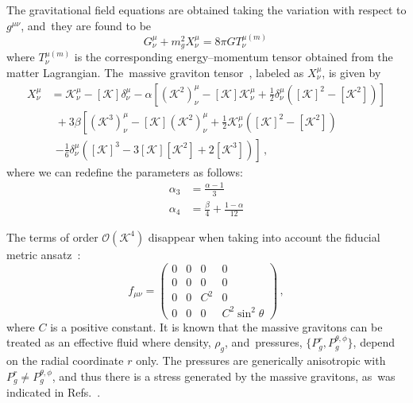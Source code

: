\documentclass[aps,amsmath,amssymb,twocolumn]{revtex4}
\begin{document}
The gravitational field equations are obtained taking the variation with respect to $g^{\mu\nu}$, and~they are found to be~\cite{Panpanich:2018cxo}
%
\begin{equation}
G^{\mu}_{\nu} + m^2_g X^{\mu}_{\nu} = 8 \pi G T^{\mu (m)}_{\nu} \,
\end{equation}
%
where $T^{\mu (m)}_{\nu}$ is the corresponding energy--momentum tensor obtained from the matter Lagrangian. The~massive graviton tensor~\cite{Berezhiani:2011mt,Ghosh:2015cva}, labeled as $X^{\mu}_{\nu}$, is given by
%
\begin{align}
X^{\mu}_{\nu} &= \mathcal{K}^{\mu}_{\nu} - [\mathcal{K}] \delta^{\mu}_{\nu} - \alpha \left[(\mathcal{K}^2)^{\mu}_{\nu} - [\mathcal{K}]\mathcal{K}^{\mu}_{\nu} +\frac{1}{2}\delta^{\mu}_{\nu} ([\mathcal{K}]^2 - [\mathcal{K}^2])\right] \nonumber \\
&~~ + 3 \beta \left[(\mathcal{K}^3)^{\mu}_{\nu} - [\mathcal{K}](\mathcal{K}^2)^{\mu}_{\nu} +\frac{1}{2}\mathcal{K}^{\mu}_{\nu} ([\mathcal{K}]^2 - [\mathcal{K}^2])\right. \nonumber \\
&~~ \left. - \frac{1}{6} \delta^{\mu}_{\nu} ([\mathcal{K}]^3 - 3 [\mathcal{K}][\mathcal{K}^2] + 2[\mathcal{K}^3]) \right] \,,
\end{align}
%
where we can redefine the parameters as follows:
%
\begin{align}
\alpha_3 &= \frac{\alpha - 1}{3} \\
\alpha_4 &= \frac{\beta}{4} + \frac{1 - \alpha}{12}
\end{align}
 
The terms of order $\mathcal{O}(\mathcal{K}^4)$ disappear when taking into account the fiducial metric ansatz~\cite{Panpanich:2018cxo}:
\begin{equation}
f_{\mu\nu} = 
  \begin{pmatrix}
    0 & 0 & 0 & 0 \\
    0 & 0 & 0 & 0 \\
    0 & 0 & C^2 & 0 \\
    0 & 0 & 0 & C^2 \sin^2 {\theta}
  \end{pmatrix} \,,
\end{equation} 
where $C$ is a positive constant.
%
It is known that the massive gravitons can be treated as an effective fluid where density, $\rho_{g}$, and~pressures, $\{P^{r}_{g}, P^{\theta,\phi}_{g}\}$, depend on the radial coordinate $r$ only.  
The pressures are generically anisotropic with $P^{r}_{g}\neq P^{\theta,\phi}_{g}$, and thus there is a stress generated by the massive gravitons, as~was indicated in Refs.~\cite{Burikham:2016cwz,Kareeso:2018xum}.
\end{document}
